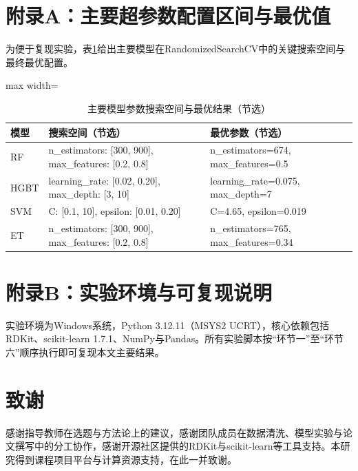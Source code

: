 \documentclass[12pt,a4paper]{article}
\begin{document}
\appendix
\section{附录A：主要超参数配置区间与最优值}

为便于复现实验，表\ref{tab:appendix_params}给出主要模型在RandomizedSearchCV中的关键搜索空间与最终最优配置。

\begin{table}[H]
\centering
\caption{主要模型参数搜索空间与最优结果（节选）}
\label{tab:appendix_params}
\begin{adjustbox}{max width=\textwidth}
\begin{tabular}{lll}
\toprule
模型 & 搜索空间（节选） & 最优参数（节选） \\
\midrule
RF & n\_estimators: [300, 900], max\_features: [0.2, 0.8] & n\_estimators=674, max\_features=0.5 \\
HGBT & learning\_rate: [0.02, 0.20], max\_depth: [3, 10] & learning\_rate=0.075, max\_depth=7 \\
SVM & C: [0.1, 10], epsilon: [0.01, 0.20] & C=4.65, epsilon=0.019 \\
ET & n\_estimators: [300, 900], max\_features: [0.2, 0.8] & n\_estimators=765, max\_features=0.34 \\
\bottomrule
\end{tabular}
\end{adjustbox}
\end{table}

\section{附录B：实验环境与可复现说明}

实验环境为Windows系统，Python 3.12.11（MSYS2 UCRT），核心依赖包括RDKit、scikit-learn 1.7.1、NumPy与Pandas。所有实验脚本按“环节一”至“环节六”顺序执行即可复现本文主要结果。

\section*{致谢}

感谢指导教师在选题与方法论上的建议，感谢团队成员在数据清洗、模型实验与论文撰写中的分工协作，感谢开源社区提供的RDKit与scikit-learn等工具支持。本研究得到课程项目平台与计算资源支持，在此一并致谢。
\end{document}
